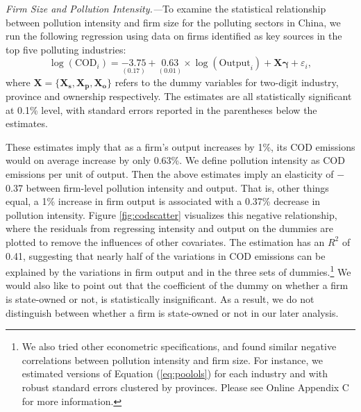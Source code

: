\documentclass[AEJ]{AEA}
\renewcommand{\vec}[1]{\ensuremath{\mathbf{#1}}}
\begin{document}
\textit{Firm Size and Pollution Intensity.---}To examine the statistical relationship between pollution intensity and firm size for the polluting sectors in China, we run the following regression using data on firms identified as key sources in the top five polluting industries:
\begin{equation}
    \log (\text{COD}_i) = \underset{(0.17)}{-3.75} + \underset{(0.01)}{0.63} \times \log (\text{Output}_i) + \vec{X} \vec{\gamma} + \varepsilon_i,
\label{eq:poolols}
\end{equation}
where $\vec{X} = \{\vec{X_s}, \vec{X_p}, \vec{X_o}\}$ refers to the dummy variables for two-digit industry, province and ownership respectively. The estimates are all statistically significant at 0.1\% level, with standard errors reported in the parentheses below the estimates.

These estimates imply that as a firm's output increases by 1\%, its COD emissions would on average increase by only 0.63\%. We define pollution intensity as COD emissions per unit of output. Then the above estimates imply an elasticity of $-$0.37 between firm-level pollution intensity and output. That is, other things equal, a 1\% increase in firm output is associated with a 0.37\% decrease in pollution intensity. Figure \ref{fig:codscatter} visualizes this negative relationship, where the residuals from regressing intensity and output on the dummies are plotted to remove the influences of other covariates. The estimation has an $R^2$ of 0.41, suggesting that nearly half of the variations in COD emissions can be explained by the variations in firm output and in the three sets of dummies.\footnote{We also tried other econometric specifications, and found similar negative correlations between pollution intensity and firm size. For instance, we estimated versions of Equation (\ref{eq:poolols}) for each industry and with robust standard errors clustered by provinces. Please see Online Appendix C for more information.} We would also like to point out that the coefficient of the dummy on whether a firm is state-owned or not, is statistically insignificant. As a result, we do not distinguish between whether a firm is state-owned or not in our later analysis.
\end{document}
